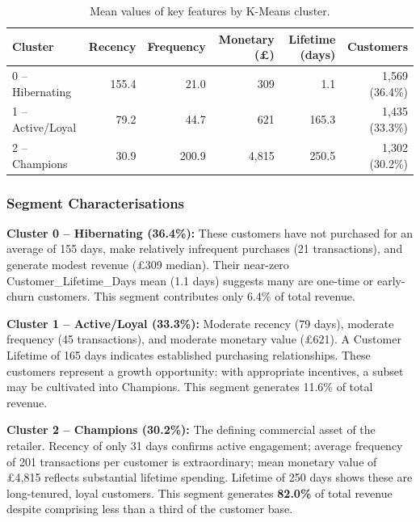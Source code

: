\documentclass[12pt,a4paper]{article}
\begin{document}
\begin{table}[H]
  \centering
  \caption{Mean values of key features by K-Means cluster.}
  \label{tab:cluster_profiles}
  \begin{tabular}{lrrrrr}
    \toprule
    \textbf{Cluster} & \textbf{Recency} & \textbf{Frequency} & \textbf{Monetary (\pounds)}
                     & \textbf{Lifetime (days)} & \textbf{Customers} \\
    \midrule
    0 -- Hibernating  & 155.4 & 21.0  &    309 & 1.1    & 1,569 (36.4\%) \\
    1 -- Active/Loyal &  79.2 & 44.7  &    621 & 165.3  & 1,435 (33.3\%) \\
    2 -- Champions    &  30.9 & 200.9 &  4,815 & 250.5  & 1,302 (30.2\%) \\
    \bottomrule
  \end{tabular}
\end{table}

\subsubsection{Segment Characterisations}

\textbf{Cluster 0 -- Hibernating (36.4\%):} These customers have not purchased for
an average of 155 days, make relatively infrequent purchases (21 transactions), and
generate modest revenue (\pounds309 median).  Their near-zero Customer\_Lifetime\_Days
mean (1.1 days) suggests many are one-time or early-churn customers.  This segment
contributes only 6.4\% of total revenue.

\textbf{Cluster 1 -- Active/Loyal (33.3\%):} Moderate recency (79 days), moderate
frequency (45 transactions), and moderate monetary value (\pounds621).  A Customer
Lifetime of 165 days indicates established purchasing relationships.  These customers
represent a growth opportunity: with appropriate incentives, a subset may be
cultivated into Champions.  This segment generates 11.6\% of total revenue.

\textbf{Cluster 2 -- Champions (30.2\%):} The defining commercial asset of the
retailer.  Recency of only 31 days confirms active engagement; average frequency
of 201 transactions per customer is extraordinary; mean monetary value of \pounds4,815
reflects substantial lifetime spending.  Lifetime of 250 days shows these are
long-tenured, loyal customers.  This segment generates \textbf{82.0\%} of total
revenue despite comprising less than a third of the customer base.
\end{document}
